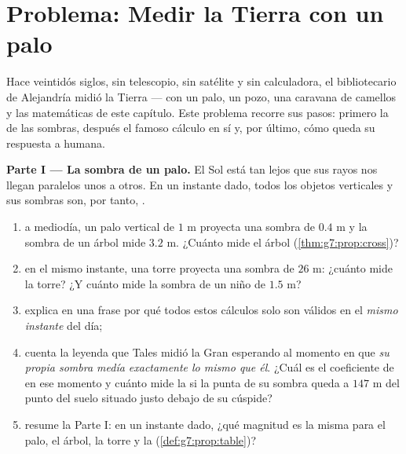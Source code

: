 \section{Problema: Medir la Tierra con un palo}

\begin{problem}
\label{pb:g7:prop:1}
Hace veintidós siglos, sin telescopio, sin satélite y sin
calculadora, el bibliotecario de Alejandría midió la Tierra ---
con un palo, un pozo, una caravana de camellos y las matemáticas de este
capítulo. Este problema recorre sus pasos: primero la
 de las sombras, después el famoso cálculo en sí
y, por último, cómo queda su respuesta a  humana.

\medskip
\noindent\textbf{Parte I --- La sombra de un palo.}
El Sol está tan lejos que sus rayos nos llegan paralelos unos a
otros. En un instante dado, todos los objetos verticales y sus
sombras son, por tanto, .
\begin{enumerate}
  \item a mediodía, un palo vertical de $1$ m proyecta una sombra de
        $0.4$ m y la sombra de un árbol mide $3.2$ m. ¿Cuánto mide
        el árbol (\cref{thm:g7:prop:cross})?
  \item en el mismo instante, una torre proyecta una sombra de $26$ m: ¿cuánto
        mide la torre? ¿Y cuánto mide la sombra de un niño
        de $1.5$ m?
  \item explica en una frase por qué todos estos cálculos solo son
        válidos en el \emph{mismo instante} del día;
  \item cuenta la leyenda que Tales midió la Gran  esperando
        al momento en que \emph{su propia sombra medía exactamente lo
        mismo que él}. ¿Cuál es el coeficiente de 
        en ese momento y cuánto mide la 
        si la punta de su sombra queda a $147$ m del punto
        del suelo situado justo debajo de su cúspide?
  \item resume la Parte I: en un instante dado, ¿qué magnitud es
        la misma para el palo, el árbol, la torre y la
         (\cref{def:g7:prop:table})?
\end{enumerate}


\end{problem}
